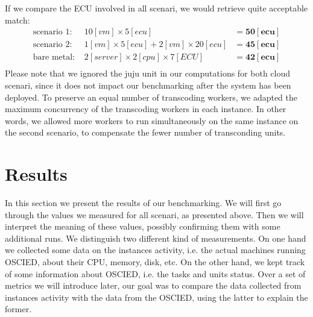 \documentclass[a4paper, titlepage]{paper}
\numberwithin{figure}{section}
\numberwithin{table}{section}
\begin{document}
      If we compare the ECU involved in all scenari, we would retrieve quite acceptable match:
      \begin{align*}
        \text{scenario 1: } & 10 [vm] \times 5 [ecu] &= \mathbf{50 [ecu]} \\
        \text{scenario 2: } & 1 [vm] \times 5 [ecu] + 2 [vm] \times 20 [ecu] &= \mathbf{45 [ecu]} \\
        \text{bare metal: } & 2 [server] \times 2 [cpu] \times 7 [ECU] &= \mathbf{42 [ecu]} \\
      \end{align*}
      Please note that we ignored the juju unit in our computations for both cloud scenari, since it does not impact our benchmarking after the system has been deployed. To preserve an equal number of transcoding workers, we adapted the maximum concurrency of the transcoding workers in each instance. In other words, we allowed more workers to run simultaneously on the same instance on the second scenario, to compensate the fewer number of transconding units.

  \section{Results}
    In this section we present the results of our benchmarking. We will first go through the values we measured for all scenari, as presented above. Then we will interpret the meaning of these values, possibly confirming them with some additional runs. We distinguish two different kind of measurements. On one hand we collected some data on the instances activity, i.e. the actual machines running OSCIED, about their CPU, memory, disk, etc. On the other hand, we kept track of some information about OSCIED, i.e. the tasks and units status. Over a set of metrics we will introduce later, our goal was to compare the data collected from instances activity with the data from the OSCIED, using the latter to explain the former.
\end{document}
